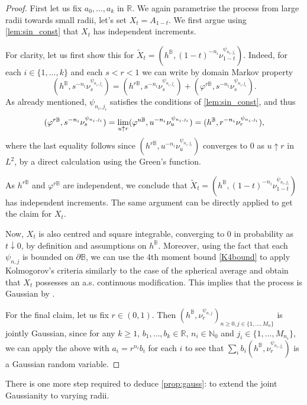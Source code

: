 \documentclass[10pt]{amsart}
\theoremstyle{definition}
\newcommand{\R}{\mathbb{R}}
\newcommand{\N}{\mathbb{N}}
\newcommand{\B}{\mathbb{B}}\let\D\B\let\Ub\B
\begin{document}
\begin{proof}
First let us fix $a_0,\dots, a_k$ in $\R$. We again parametrise the process from large radii towards small radii, \ie let's set $X_t = A_{1-t}$. We first argue using \cref{lem:sin_const} that $X_t$ has independent increments.

For clarity, let us first show this for $\tilde X_t = (h^\D,(1-t)^{-n_i}\nu^{\psi_{n_i,j_i}}_{1-t})$. Indeed, for each $i \in \{1, \dots, k\}$ and each $s < r < 1$ we can write by domain Markov property\vspace*{-3pt}
\[
(h^\D,s^{-n_i}\nu^{\psi_{n_i,j_i}}_s) = (h^{r\D},s^{-n_i}\nu^{\psi_{n_i,j_i}}_s) + (\varphi^{r\D},s^{-n_i}\nu^{\psi_{n_i,j_i}}_s).
\]
As already mentioned, $\psi_{n_i,j_i}$ satisfies the conditions of \cref{lem:sin_const}, and thus\vspace*{-3pt}
\[
(\varphi^{r\D},s^{-n_i}\nu^{\psi_{n_i,j_i}}_s) = \lim_{u\uparrow r}(\varphi^{u\D},u^{-n_i}\nu^{\psi_{n_i,j_i}}_u)=(h^\B,r^{-n_i}\nu_r^{\psi_{n_i,j_i}}),\vspace*{-3pt}
\]
where the last equality follows since $(h^{r\B},u^{-n_i}\nu^{\psi_{n_i,j_i}}_u)$ converges to $0$ as $u\uparrow r$ in $L^2$, by a direct calculation using the Green's function.

As $h^{r\D}$ and $\varphi^{r\D}$ are independent, we conclude that {$\tilde X_t = (h^\D,(1-t)^{-n_i}\nu^{\psi_{n_i,j_i}}_{1-t})$ has independent increments.} {The same} argument can be directly applied to get the claim for $X_t$.

Now, $X_t$ is also centred and square integrable, converging to $0$ in probability as~\hbox{$t\!\downarrow\!0$}, by definition and assumptions on $h^\B$. Moreover, {using the fact that each $\psi_{n,j}$ is bound\-ed on $\partial \B$, we can use the 4th moment bound \eqref{K4bound} to apply Kolmogorov's criteria similarly to the case of the spherical average and obtain that $X_t$ possesses an a.s. continuous modification.} This implies that the process is Gaussian by \cite[Th.\,11.4]{Kallenberg}.

For the final claim, let us fix $r\in (0,1)$. Then $(h^\B, \nu^{\psi_{n,j}}_r)_{n \geq 0, j \in \{1, \dots, M_n\}}$ is jointly Gaussian, since for any $k\ge 1$, $b_1,\dots, b_k\in \R$, $n_i\in \N_0$ and $j_i\in \{1,\dots, M_{n_i}\}$, we can apply the above with $a_i=r^{n_i}b_i$ for each $i$ to see that $\sum_i b_i (h^\B,\nu_r^{\psi_{n_i,j_i}})$ is a Gaussian random variable.
\end{proof}

There is one more step required to deduce \cref{prop:gauss}: to extend the joint Gaussianity to varying radii.
\end{document}
